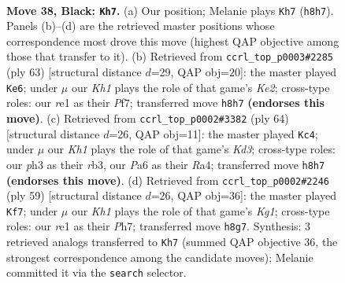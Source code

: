 \documentclass[11pt]{article}
\begin{document}
\clearpage

\begin{figure}[p]\centering
\begin{subfigure}{0.46\textwidth}\centering
\resizebox{\linewidth}{!}{%
\newchessgame
\chessboard[
  setfen={1r5k/1p3p2/p3p3/8/P3P3/5PKP/1R5P/4R3 b - - 6 38},
  showmover=false,
  pgfstyle=straightmove, color=movearrow, markmove={h8-h7}
]}
\caption{}
\end{subfigure}\hfill
\begin{subfigure}{0.46\textwidth}\centering
\resizebox{\linewidth}{!}{%
\newchessgame
\chessboard[
  setfen={2r5/4kpp1/7p/p1p5/P3P2P/1PR2K2/6P1/8 b - - 2 32},
  showmover=false,
  pgfstyle=straightmove, color=movearrow, markmove={e7-e6}
]}
\caption{}
\end{subfigure}
\\[4pt]
\begin{subfigure}{0.46\textwidth}\centering
\resizebox{\linewidth}{!}{%
\newchessgame
\chessboard[
  setfen={8/5pk1/p2r2p1/7p/R2P4/1r1K2P1/5P1P/3R4 w - - 4 33},
  showmover=false,
  pgfstyle=straightmove, color=movearrow, markmove={d3-c4}
]}
\caption{}
\end{subfigure}\hfill
\begin{subfigure}{0.46\textwidth}\centering
\resizebox{\linewidth}{!}{%
\newchessgame
\chessboard[
  setfen={3r2k1/p6p/1p2p3/7p/3P4/P2R1PK1/6PP/8 b - - 0 30},
  showmover=false,
  pgfstyle=straightmove, color=movearrow, markmove={g8-f7}
]}
\caption{}
\end{subfigure}
\caption{\textbf{Move 38, Black: \texttt{Kh7}.} (a) Our position; Melanie plays \texttt{Kh7} (\texttt{h8h7}). Panels (b)--(d) are the retrieved master positions whose correspondence most drove this move (highest QAP objective among those that transfer to it). (b) Retrieved from \texttt{ccrl\_top\_p0003\#2285} (ply 63) [structural distance $d$=29, QAP obj=20]: the master played \texttt{Ke6}; under $\mu$ our \emph{Kh1} plays the role of that game's \emph{Ke2}; cross-type roles: our \emph{r}e1 as their \emph{P}f7; transferred move \texttt{h8h7} \textbf{(endorses this move)}. (c) Retrieved from \texttt{ccrl\_top\_p0002\#3382} (ply 64) [structural distance $d$=26, QAP obj=11]: the master played \texttt{Kc4}; under $\mu$ our \emph{Kh1} plays the role of that game's \emph{Kd3}; cross-type roles: our \emph{p}h3 as their \emph{r}b3, our \emph{P}a6 as their \emph{R}a4; transferred move \texttt{h8h7} \textbf{(endorses this move)}. (d) Retrieved from \texttt{ccrl\_top\_p0002\#2246} (ply 59) [structural distance $d$=26, QAP obj=36]: the master played \texttt{Kf7}; under $\mu$ our \emph{Kh1} plays the role of that game's \emph{Kg1}; cross-type roles: our \emph{r}e1 as their \emph{P}h7; transferred move \texttt{h8g7}. Synthesis: 3 retrieved analogs transferred to \texttt{Kh7} (summed QAP objective 36, the strongest correspondence among the candidate moves); Melanie committed it via the \texttt{search} selector.}
\label{fig:thought-m75}
\end{figure}
\end{document}
